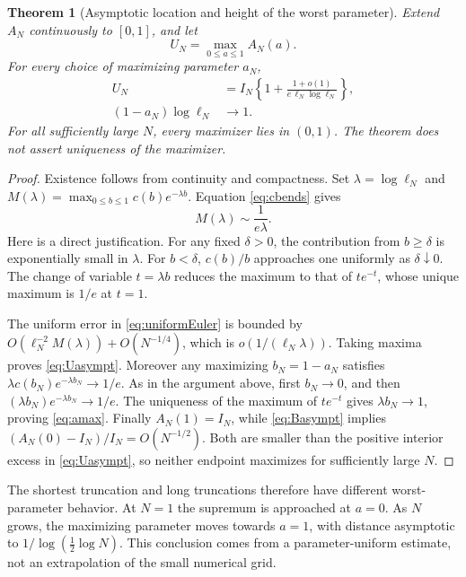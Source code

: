 \documentclass[11pt]{article}
\numberwithin{equation}{section}
\newtheorem{theorem}{Theorem}[section]
\theoremstyle{definition}\newtheorem{definition}[theorem]{Definition}
\theoremstyle{remark}\newtheorem{remark}[theorem]{Remark}
\begin{document}
\begin{theorem}[Asymptotic location and height of the worst parameter]
\label{thm:maximizer}
Extend $A_N$ continuously to $[0,1]$, and let
\begin{equation}\label{eq:UN}
 U_N=\max_{0\le a\le1}A_N(a).
\end{equation}
For every choice of maximizing parameter $a_N$,
\begin{align}
 U_N&=I_N\left\{1+\frac{1+o(1)}{e\,\ell_N\log\ell_N}\right\},
 \label{eq:Uasympt}\\
 (1-a_N)\log\ell_N&\longrightarrow1.\label{eq:amax}
\end{align}
For all sufficiently large $N$, every maximizer lies in $(0,1)$.
The theorem does not assert uniqueness of the maximizer.
\end{theorem}
\begin{proof}
Existence follows from continuity and compactness. Set
$\lambda=\log\ell_N$ and
$M(\lambda)=\max_{0\le b\le1}c(b)e^{-\lambda b}$.
Equation \eqref{eq:cbends} gives
\begin{equation}\label{eq:elementarymax}
 M(\lambda)\sim\frac1{e\lambda}.
\end{equation}
Here is a direct justification. For any fixed $\delta>0$, the
contribution from $b\ge\delta$ is exponentially small in $\lambda$.
For $b<\delta$, $c(b)/b$ approaches one uniformly as $\delta\downarrow0$.
The change of variable $t=\lambda b$ reduces the maximum to that of
$te^{-t}$, whose unique maximum is $1/e$ at $t=1$.

The uniform error in \eqref{eq:uniformEuler} is bounded by
$O(\ell_N^{-2}M(\lambda))+O(N^{-1/4})$, which is
$o(1/(\ell_N\lambda))$. Taking maxima proves \eqref{eq:Uasympt}.
Moreover any maximizing $b_N=1-a_N$ satisfies
$\lambda c(b_N)e^{-\lambda b_N}\to1/e$.
As in the argument above, first $b_N\to0$, and then
$(\lambda b_N)e^{-\lambda b_N}\to1/e$. The uniqueness of the maximum
of $te^{-t}$ gives $\lambda b_N\to1$, proving \eqref{eq:amax}.
Finally $A_N(1)=I_N$, while \eqref{eq:Basympt} implies
$(A_N(0)-I_N)/I_N=O(N^{-1/2})$. Both are smaller than the positive
interior excess in \eqref{eq:Uasympt}, so neither endpoint maximizes
for sufficiently large $N$.
\end{proof}

The shortest truncation and long truncations therefore have different
worst-parameter behavior. At $N=1$ the supremum is approached at
$a=0$. As $N$ grows, the maximizing parameter moves towards $a=1$,
with distance asymptotic to $1/\log(\tfrac12\log N)$. This conclusion
comes from a parameter-uniform estimate, not an extrapolation of the
small numerical grid.
\end{document}
